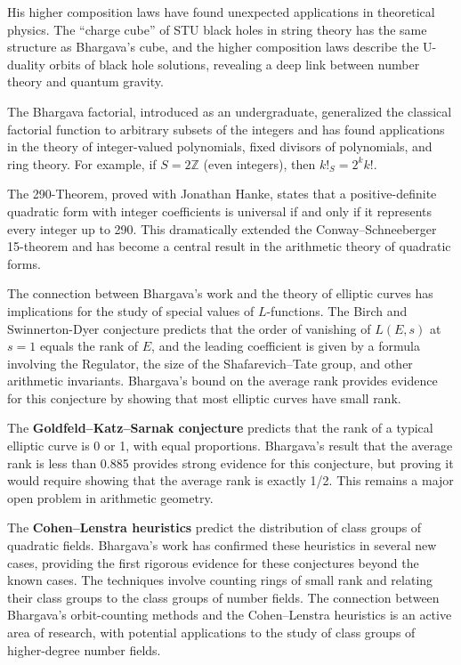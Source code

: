 His higher composition laws have found unexpected applications in theoretical physics. The ``charge cube'' of STU black holes in string theory has the same structure as Bhargava's cube, and the higher composition laws describe the U-duality orbits of black hole solutions, revealing a deep link between number theory and quantum gravity.

The Bhargava factorial, introduced as an undergraduate, generalized the classical factorial function to arbitrary subsets of the integers and has found applications in the theory of integer-valued polynomials, fixed divisors of polynomials, and ring theory. For example, if $S = 2\mathbb{Z}$ (even integers), then $k!_S = 2^k k!$.

The 290-Theorem, proved with Jonathan Hanke, states that a positive-definite quadratic form with integer coefficients is universal if and only if it represents every integer up to 290. This dramatically extended the Conway--Schneeberger 15-theorem and has become a central result in the arithmetic theory of quadratic forms.

The connection between Bhargava's work and the theory of elliptic curves has implications for the study of special values of $L$-functions. The Birch and Swinnerton-Dyer conjecture predicts that the order of vanishing of $L(E,s)$ at $s=1$ equals the rank of $E$, and the leading coefficient is given by a formula involving the Regulator, the size of the Shafarevich--Tate group, and other arithmetic invariants. Bhargava's bound on the average rank provides evidence for this conjecture by showing that most elliptic curves have small rank.

The \textbf{Goldfeld--Katz--Sarnak conjecture} predicts that the rank of a typical elliptic curve is 0 or 1, with equal proportions. Bhargava's result that the average rank is less than 0.885 provides strong evidence for this conjecture, but proving it would require showing that the average rank is exactly 1/2. This remains a major open problem in arithmetic geometry.

The \textbf{ Cohen--Lenstra heuristics} predict the distribution of class groups of quadratic fields. Bhargava's work has confirmed these heuristics in several new cases, providing the first rigorous evidence for these conjectures beyond the known cases. The techniques involve counting rings of small rank and relating their class groups to the class groups of number fields. The connection between Bhargava's orbit-counting methods and the Cohen--Lenstra heuristics is an active area of research, with potential applications to the study of class groups of higher-degree number fields.

